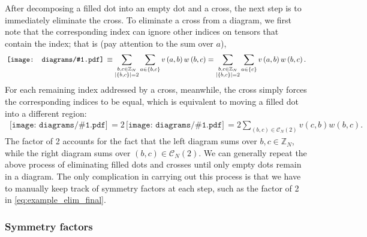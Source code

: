 \documentclass[nofootinbib,notitlepage,11pt]{revtex4-2}
\newcommand{\p}[1]{\left(#1\right)} %
\renewcommand{\set}[1]{\left\{#1\right\}} %
\newcommand{\1}{\mathds{1}}
\newcommand{\C}{\mathcal{C}}
\newcommand{\ZZ}{\mathbb{Z}}
\newcommand{\diagram}[1]
{\,\texttt{[image: diagrams/\#1.pdf]}\,}
\begin{document}
After decomposing a filled dot into an empty dot and a cross, the next
step is to immediately eliminate the cross.  To eliminate a cross from
a diagram, we first note that the corresponding index can ignore other
indices on tensors that contain the index; that is (pay attention to
the sum over $a$),
\begin{align}
  \diagram{example_elim_x}
  \equiv \sum_{\substack{b,c\in\ZZ_N\\\abs{\set{b,c}}=2}}
  \sum_{a\in\set{b,c}} v\p{a,b} w\p{b,c}
  = \sum_{\substack{b,c\in\ZZ_N\\\abs{\set{b,c}}=2}}
  \sum_{a\in\set{c}} v\p{a,b} w\p{b,c}.
\end{align}
For each remaining index addressed by a cross, meanwhile, the cross
simply forces the corresponding indices to be equal, which is
equivalent to moving a filled dot into a different region:
\begin{align}
  \diagram{example_elim_x}
  = 2 \diagram{example_elim_x_full}
  = 2 \sum_{\p{b,c}\in\C_N\p{2}} v\p{c,b} w\p{b,c}.
  \label{eq:example_elim_final}
\end{align}
The factor of 2 accounts for the fact that the left diagram sums over
$b,c\in\ZZ_N$, while the right diagram sums over
$\p{b,c}\in\C_N\p{2}$.  We can generally repeat the above process of
eliminating filled dots and crosses until only empty dots remain in a
diagram.  The only complication in carrying out this process is that
we have to manually keep track of symmetry factors at each step, such
as the factor of 2 in \eqref{eq:example_elim_final}.

\subsubsection{Symmetry factors}
\label{sec:symmertry_factors}
\end{document}
